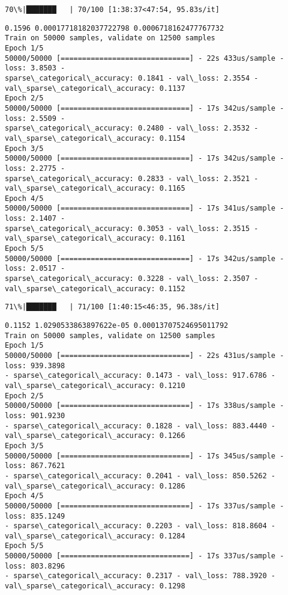 \documentclass[11pt]{article}
\begin{document}
    \begin{Verbatim}[commandchars=\\\{\}]
 70\%|███████   | 70/100 [1:38:37<47:54, 95.83s/it]
    \end{Verbatim}

    \begin{Verbatim}[commandchars=\\\{\}]
0.1596 0.00017718182037722798 0.0006718162477767732
Train on 50000 samples, validate on 12500 samples
Epoch 1/5
50000/50000 [==============================] - 22s 433us/sample - loss: 3.8503 -
sparse\_categorical\_accuracy: 0.1841 - val\_loss: 2.3554 -
val\_sparse\_categorical\_accuracy: 0.1137
Epoch 2/5
50000/50000 [==============================] - 17s 342us/sample - loss: 2.5509 -
sparse\_categorical\_accuracy: 0.2480 - val\_loss: 2.3532 -
val\_sparse\_categorical\_accuracy: 0.1154
Epoch 3/5
50000/50000 [==============================] - 17s 342us/sample - loss: 2.2775 -
sparse\_categorical\_accuracy: 0.2833 - val\_loss: 2.3521 -
val\_sparse\_categorical\_accuracy: 0.1165
Epoch 4/5
50000/50000 [==============================] - 17s 341us/sample - loss: 2.1407 -
sparse\_categorical\_accuracy: 0.3053 - val\_loss: 2.3515 -
val\_sparse\_categorical\_accuracy: 0.1161
Epoch 5/5
50000/50000 [==============================] - 17s 342us/sample - loss: 2.0517 -
sparse\_categorical\_accuracy: 0.3228 - val\_loss: 2.3507 -
val\_sparse\_categorical\_accuracy: 0.1152
    \end{Verbatim}

    \begin{Verbatim}[commandchars=\\\{\}]
 71\%|███████   | 71/100 [1:40:15<46:35, 96.38s/it]
    \end{Verbatim}

    \begin{Verbatim}[commandchars=\\\{\}]
0.1152 1.0290533863897622e-05 0.00013707524695011792
Train on 50000 samples, validate on 12500 samples
Epoch 1/5
50000/50000 [==============================] - 22s 431us/sample - loss: 939.3898
- sparse\_categorical\_accuracy: 0.1473 - val\_loss: 917.6786 -
val\_sparse\_categorical\_accuracy: 0.1210
Epoch 2/5
50000/50000 [==============================] - 17s 338us/sample - loss: 901.9230
- sparse\_categorical\_accuracy: 0.1828 - val\_loss: 883.4440 -
val\_sparse\_categorical\_accuracy: 0.1266
Epoch 3/5
50000/50000 [==============================] - 17s 345us/sample - loss: 867.7621
- sparse\_categorical\_accuracy: 0.2041 - val\_loss: 850.5262 -
val\_sparse\_categorical\_accuracy: 0.1286
Epoch 4/5
50000/50000 [==============================] - 17s 337us/sample - loss: 835.1249
- sparse\_categorical\_accuracy: 0.2203 - val\_loss: 818.8604 -
val\_sparse\_categorical\_accuracy: 0.1284
Epoch 5/5
50000/50000 [==============================] - 17s 337us/sample - loss: 803.8296
- sparse\_categorical\_accuracy: 0.2317 - val\_loss: 788.3920 -
val\_sparse\_categorical\_accuracy: 0.1298
    \end{Verbatim}
\end{document}
